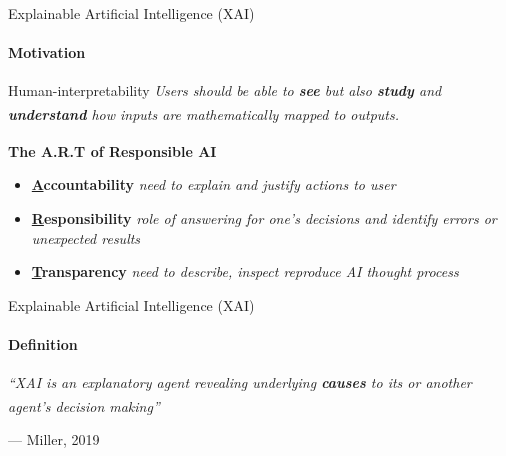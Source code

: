 \documentclass{beamer}
\begin{document}
\begin{frame}{\small{Explainable Artificial Intelligence (XAI)}}
    \framesubtitle{Motivation}
    \begin{block}{Human-interpretability}
        \emph{Users should be able to \textbf{see} but also \textbf{study} and \textbf{understand} how inputs are mathematically mapped to outputs.} \textsuperscript{\cite{doran2017does}}
    \end{block}
    \vfill
    \textbf{The A.R.T of Responsible AI \textsuperscript{\cite{adadi2018peeking}}}
    \begin{itemize}
        \item \textbf{\underline{A}ccountability} \textit{need to explain and justify actions to user}
        \item \textbf{\underline{R}esponsibility} \textit{role of answering for one's decisions and identify errors or unexpected results}
        \item \textbf{\underline{T}ransparency} \textit{need to describe, inspect reproduce AI thought process}
    \end{itemize}

\end{frame}

\begin{frame}{\small{Explainable Artificial Intelligence (XAI)}}
    \framesubtitle{Definition}
    \vfill

    \begin{center}
        \emph{``XAI is an explanatory agent revealing underlying \textbf{causes} to its or another agent’s decision making''} \textsuperscript{\citep{miller2019explanation}}
    \end{center}
    \begin{flushright}
        --- Miller, 2019
    \end{flushright}
    \vfill

\end{frame}
\end{document}
